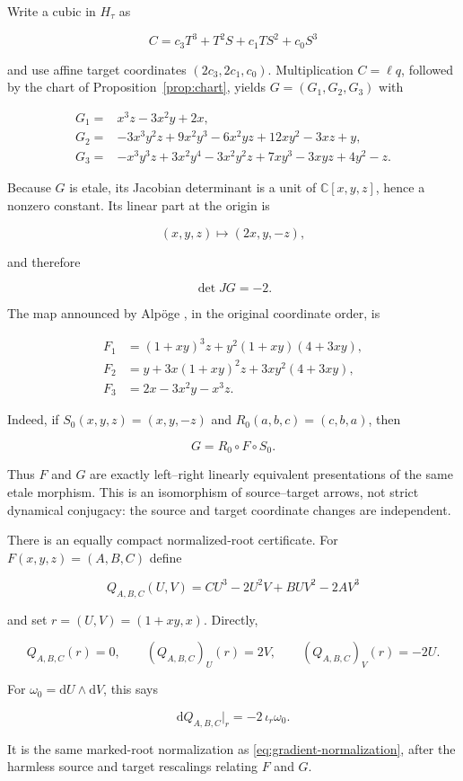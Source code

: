 \documentclass[11pt,a4paper]{article}
\theoremstyle{remark}
\newcommand{\C}{\mathbb C}
\newcommand{\dd}{\mathrm d}
\begin{document}
Write a cubic in $H_\tau$ as

\[
  C=c_3T^3+T^2S+c_1TS^2+c_0S^3
\]

and use affine target coordinates $(2c_3,2c_1,c_0)$.  Multiplication
$C=\ell q$, followed by the chart of Proposition~\ref{prop:chart}, yields
$G=(G_1,G_2,G_3)$ with

\begin{align*}
G_1={}&x^3z-3x^2y+2x,\\
G_2={}&-3x^3y^2z+9x^2y^3-6x^2yz+12xy^2-3xz+y,\\
G_3={}&-x^3y^3z+3x^2y^4-3x^2y^2z+7xy^3-3xyz+4y^2-z.
\end{align*}

Because $G$ is etale, its Jacobian determinant is a unit of
$\C[x,y,z]$, hence a nonzero constant.  Its linear part at the origin is

\[
  (x,y,z)\longmapsto(2x,y,-z),
\]

and therefore

\[
  \boxed{\det JG=-2.}
\]

The map announced by Alp\"oge \cite{Alpoge}, in the original coordinate order,
is

\begin{align*}
F_1&=(1+xy)^3z+y^2(1+xy)(4+3xy),\\
F_2&=y+3x(1+xy)^2z+3xy^2(4+3xy),\\
F_3&=2x-3x^2y-x^3z.
\end{align*}

Indeed, if $S_0(x,y,z)=(x,y,-z)$ and
$R_0(a,b,c)=(c,b,a)$, then

\[
  G=R_0\circ F\circ S_0.
\]

Thus $F$ and $G$ are exactly left--right linearly equivalent presentations of
the same etale morphism.  This is an isomorphism of source--target arrows, not
strict dynamical conjugacy: the source and target coordinate changes are
independent.

There is an equally compact normalized-root certificate.  For
$F(x,y,z)=(A,B,C)$ define

\[
  Q_{A,B,C}(U,V)=CU^3-2U^2V+BUV^2-2AV^3
\]

and set $r=(U,V)=(1+xy,x)$.  Directly,

\[
  Q_{A,B,C}(r)=0,
  \qquad
  (Q_{A,B,C})_U(r)=2V,
  \qquad
  (Q_{A,B,C})_V(r)=-2U.
\]

For $\omega_0=\dd U\wedge\dd V$, this says

\[
  \dd Q_{A,B,C}\big|_r=-2\,\iota_r\omega_0.
\]

It is the same marked-root normalization as
\eqref{eq:gradient-normalization}, after the harmless source and target
rescalings relating $F$ and $G$.
\end{document}
